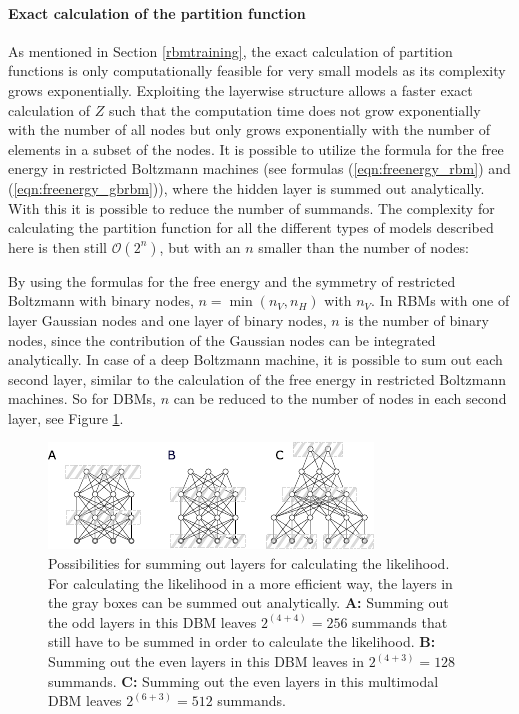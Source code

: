 \documentclass[12pt]{article}
\begin{document}
\paragraph{Exact calculation of the partition function}
\label{methodExactloglik}
As mentioned in Section \ref{rbmtraining}, the exact calculation of partition functions is only computationally feasible for very small models as its complexity grows exponentially. Exploiting the layerwise structure allows a faster exact calculation of $Z$ such that the computation time does not grow exponentially with the number of all nodes but only grows exponentially with the number of elements in a subset of the nodes. It is possible to utilize the formula for the free energy in restricted Boltzmann machines (see formulas (\ref{eqn:freenergy_rbm}) and (\ref{eqn:freenergy_gbrbm})), where the hidden layer is summed out analytically.
With this it is possible to reduce the number of summands.
The complexity for calculating the partition function for all the different types of  models described here is then still $\mathcal{O}(2^n)$, but with an $n$ smaller than the number of nodes:

By using the formulas for the free energy and the symmetry of restricted Boltzmann with binary nodes, $n = \min(n_V, n_H)$ with $n_V$.
In RBMs with one of layer Gaussian nodes and one layer of binary nodes, $n$ is the number of binary nodes, since the contribution of the Gaussian nodes can be integrated analytically.
In case of a deep Boltzmann machine, it is possible to sum out each second layer, similar to the calculation of the free energy in restricted Boltzmann machines. So for DBMs, $n$ can be reduced to the number of nodes in each second layer, see Figure \ref{aissummingout}.

\begin{figure}[h!]
\centering
\includegraphics[scale=2.5]{images/AISsummingout.pdf}
\caption{Possibilities for summing out layers for calculating the likelihood. For calculating the likelihood in a more efficient way, the layers in the gray boxes can be summed out analytically. {\bf A:} Summing out the odd layers in this DBM leaves $2^{(4 + 4)} = 256$ summands that still have to be summed in order to calculate the likelihood. {\bf B:} Summing out the even layers in this DBM leaves in $2^{(4 + 3)} = 128$ summands. {\bf C:} Summing out the even layers in  this multimodal DBM leaves $2^{(6 + 3)} = 512$ summands.}
\label{aissummingout}
\end{figure}
\end{document}
